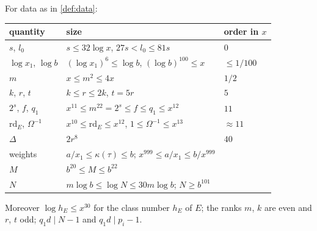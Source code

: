 \begin{proposition}[Sizes]\label{prop:sizes}
For data as in \cref{def:data}:
\begin{center}
\begin{tabular}{lll}
\toprule
quantity & size & order in $x$\\
\midrule
$s$, $l_0$ & $s\le32\log x$, $27s<l_0\le81s$ & $0$\\
$\log x_1$, $\log b$ & $(\log x_1)^6\le\log b$, $(\log b)^{100}\le x$ & $\le1/100$\\
$m$ & $x\le m^2\le4x$ & $1/2$\\
$k$, $r$, $t$ & $k\le r\le2k$, $t=5r$ & $5$\\
$2^s$, $f$, $q_1$ & $x^{11}\le m^{22}=2^s\le f\le q_1\le x^{12}$ & $11$\\
$\mathrm{rd}_E$, $\Omega^{-1}$ & $x^{10}\le\mathrm{rd}_E\le x^{12}$, $1\le\Omega^{-1}\le x^{13}$ & $\approx11$\\
$\Delta$ & $2r^8$ & $40$\\
weights & $a/x_1\le\kappa(\tau)\le b$; $x^{999}\le a/x_1\le b/x^{999}$ & \\
$M$ & $b^{20}\le M\le b^{22}$ & \\
$N$ & $m\log b\le\log N\le30m\log b$; $N\ge b^{101}$ & \\
\bottomrule
\end{tabular}
\end{center}
Moreover $\log h_E\le x^{30}$ for the class number $h_E$ of $E$; the ranks $m$, $k$ are even and
$r$, $t$ odd; $q_1d\mid N-1$ and $q_1d\mid p_i-1$.
\end{proposition}

